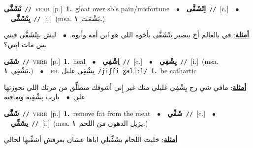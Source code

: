 \documentclass[10pt,a4paper,twoside]{article} %
\begin{document}
\begin{multicols}{2}
{\setlength\topsep{0pt}\textbf{\foreignlanguage{arabic}{تْشَفَّى}}\ {\color{gray}\texttt{//}\color{black}}\ \textsc{verb}\ [p.]\ \textbf{1.}~gloat over sb's pain/misfortune\ \ $\bullet$\ \ \setlength\topsep{0pt}\textbf{\foreignlanguage{arabic}{اِتْشَفَّى}}\ {\color{gray}\texttt{//}\color{black}}\ [c.]\ \ $\bullet$\ \ \setlength\topsep{0pt}\textbf{\foreignlanguage{arabic}{يِتْشَفَّى}}\ {\color{gray}\texttt{//}\color{black}}\ [i.]\ \color{gray}(msa. \foreignlanguage{arabic}{يَشْمَت}~\foreignlanguage{arabic}{\textbf{١.}})\color{black}\  \begin{flushright}\color{gray}\foreignlanguage{arabic}{\textbf{\underline{\foreignlanguage{arabic}{أمثلة}}}: في بالعالم أخ بيصير يِتْشَفَّى بأخوه اللي هو ابن أمه وأبوه.\ $\bullet$\ \  ليش بتِتْشَفَّى فيني بس مات ابني؟}\end{flushright}\color{black}} \vspace{2mm}

{\setlength\topsep{0pt}\textbf{\foreignlanguage{arabic}{شَفَى}}\ {\color{gray}\texttt{//}\color{black}}\ \textsc{verb}\ [p.]\ \textbf{1.}~heal\ \ $\bullet$\ \ \setlength\topsep{0pt}\textbf{\foreignlanguage{arabic}{اِشْفِي}}\ {\color{gray}\texttt{//}\color{black}}\ [c.]\ \ $\bullet$\ \ \setlength\topsep{0pt}\textbf{\foreignlanguage{arabic}{يِشْفِي}}\ {\color{gray}\texttt{//}\color{black}}\ [i.]\ \color{gray}(msa. \foreignlanguage{arabic}{يَشْفِي}~\foreignlanguage{arabic}{\textbf{١.}})\color{black}\ \ $\bullet$\ \ \textsc{ph.} \color{gray} \foreignlanguage{arabic}{يِشْفِي غليل}\color{black}\ {\color{gray}\texttt{/{\sffamily jiʃfi ɣaliːl}/}\color{black}}\ \textbf{1.}~be cathartic\  \begin{flushright}\color{gray}\foreignlanguage{arabic}{\textbf{\underline{\foreignlanguage{arabic}{أمثلة}}}: مافي شي رح يِشْفِي غليلي منك غير إِني أشوفك متطلِّق من مرتك اللي تجوزتها علي\ $\bullet$\ \  يارب يِشْفِيه ويعافيه}\end{flushright}\color{black}} \vspace{2mm}

{\setlength\topsep{0pt}\textbf{\foreignlanguage{arabic}{شَفَّى}}\ {\color{gray}\texttt{//}\color{black}}\ \textsc{verb}\ [p.]\ \textbf{1.}~remove fat from the meat\ \ $\bullet$\ \ \setlength\topsep{0pt}\textbf{\foreignlanguage{arabic}{شَفِّي}}\ {\color{gray}\texttt{//}\color{black}}\ [c.]\ \ $\bullet$\ \ \setlength\topsep{0pt}\textbf{\foreignlanguage{arabic}{يشَفِّي}}\ {\color{gray}\texttt{//}\color{black}}\ [i.]\ \color{gray}(msa. \foreignlanguage{arabic}{يزيل الدهون من اللحم}~\foreignlanguage{arabic}{\textbf{١.}})\color{black}\  \begin{flushright}\color{gray}\foreignlanguage{arabic}{\textbf{\underline{\foreignlanguage{arabic}{أمثلة}}}: خليت اللحام يشَفِّيلي اياها عشان بعرفش أشفِّيها لحالي}\end{flushright}\color{black}} \vspace{2mm}


\end{multicols}
\end{document}
